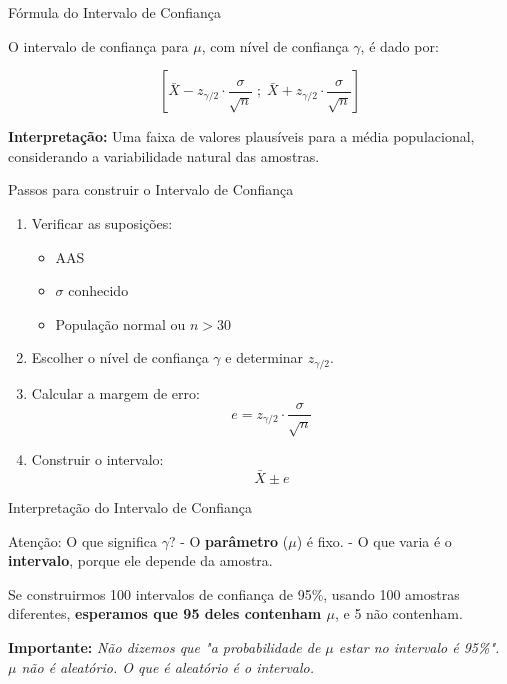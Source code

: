 \documentclass[14pt,aspectratio=1610]{beamer}
\begin{document}
\begin{frame}{Fórmula do Intervalo de Confiança}
	\begin{block}{}
		O intervalo de confiança para $\mu$, com nível de confiança $\gamma$, é dado por:
		
		\[
		\left[
		\bar{X} - z_{\gamma/2} \cdot \frac{\sigma}{\sqrt{n}} \; ; \;
		\bar{X} + z_{\gamma/2} \cdot \frac{\sigma}{\sqrt{n}}
		\right]
		\]
		
		\textbf{Interpretação:} Uma faixa de valores plausíveis para a média populacional, considerando a variabilidade natural das amostras.
	\end{block}
\end{frame}

\begin{frame}{Passos para construir o Intervalo de Confiança}
	\begin{enumerate}
		\item Verificar as suposições:
		\begin{itemize}
			\item AAS
			\item $\sigma$ conhecido
			\item População normal ou $n > 30$
		\end{itemize}
		\item Escolher o nível de confiança $\gamma$ e determinar $z_{\gamma/2}$.
		\item Calcular a margem de erro:
		\[
		e = z_{\gamma/2} \cdot \frac{\sigma}{\sqrt{n}}
		\]
		\item Construir o intervalo:
		\[
		\bar{X} \pm e
		\]
	\end{enumerate}
\end{frame}

\begin{frame}{Interpretação do Intervalo de Confiança}
	\begin{block}{Atenção: O que significa $\gamma$?}
		\justifying
		- O \textbf{parâmetro} ($\mu$) é fixo.  
		- O que varia é o \textbf{intervalo}, porque ele depende da amostra.  
		
		Se construirmos 100 intervalos de confiança de 95\%, usando 100 amostras diferentes, \textbf{esperamos que 95 deles contenham $\mu$}, e 5 não contenham.
		
		\textbf{Importante:} \textit{Não dizemos que "a probabilidade de $\mu$ estar no intervalo é 95\%". $\mu$ não é aleatório. O que é aleatório é o intervalo.}
	\end{block}
\end{frame}
\end{document}
